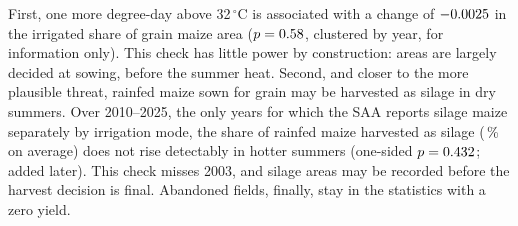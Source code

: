 First, one more degree-day above 32\,$^{\circ}$C is associated with a change of $-0.0025$ in the irrigated share of grain maize area ($p = 0.58$, clustered by year, for information only). This check has little power by construction: areas are largely decided at sowing, before the summer heat. Second, and closer to the more plausible threat, rainfed maize sown for grain may be harvested as silage in dry summers. Over 2010--2025, the only years for which the SAA reports silage maize separately by irrigation mode, the share of rainfed maize harvested as silage (\SilageShare\,\% on average) does not rise detectably in hotter summers (one-sided $p = 0.432$; added later). This check misses 2003, and silage areas may be recorded before the harvest decision is final. Abandoned fields, finally, stay in the statistics with a zero yield.
